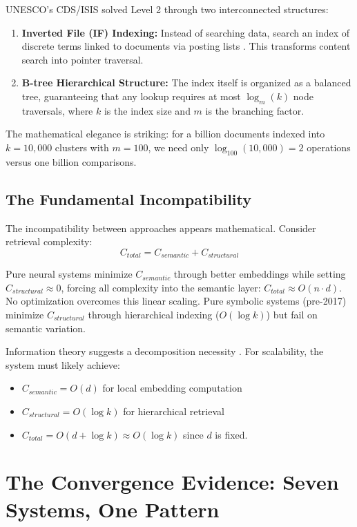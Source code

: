 \documentclass[manuscript,screen,nonacm]{acmart}
\begin{document}
UNESCO's CDS/ISIS solved Level 2 through two interconnected structures:
\begin{enumerate}
    \item \textbf{Inverted File (IF) Indexing:} Instead of searching data, search an index of discrete terms linked to documents via posting lists \cite{zobel2006}. This transforms content search into pointer traversal.
    \item \textbf{B-tree Hierarchical Structure:} The index itself is organized as a balanced tree, guaranteeing that any lookup requires at most $\log_m(k)$ node traversals, where $k$ is the index size and $m$ is the branching factor.
\end{enumerate}

The mathematical elegance is striking: for a billion documents indexed into $k=10,000$ clusters with $m=100$, we need only $\log_{100}(10,000) = 2$ operations versus one billion comparisons.

\subsection{The Fundamental Incompatibility}

The incompatibility between approaches appears mathematical. Consider retrieval complexity:
\[ C_{total} = C_{semantic} + C_{structural} \]

Pure neural systems minimize $C_{semantic}$ through better embeddings while setting $C_{structural} \approx 0$, forcing all complexity into the semantic layer: $C_{total} \approx O(n \cdot d)$. No optimization overcomes this linear scaling. Pure symbolic systems (pre-2017) minimize $C_{structural}$ through hierarchical indexing ($O(\log k)$) but fail on semantic variation.

Information theory suggests a decomposition necessity \cite{chen2025}. For scalability, the system must likely achieve:
\begin{itemize}
    \item $C_{semantic} = O(d)$ for local embedding computation
    \item $C_{structural} = O(\log k)$ for hierarchical retrieval
    \item $C_{total} = O(d + \log k) \approx O(\log k)$ since $d$ is fixed.
\end{itemize}

\section{The Convergence Evidence: Seven Systems, One Pattern}
\end{document}
